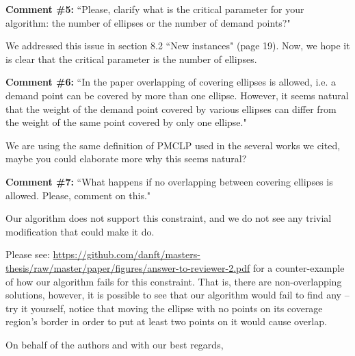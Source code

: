 \begin{letter}{}
		\textbf{Comment \#5:} ``Please, clarify what is the critical parameter for your algorithm: the number of ellipses or the number of demand points?"
		
		We addressed this issue in section 8.2 ``New instances" (page 19). Now, we hope it is clear that the critical parameter is the number of ellipses.
		
		\textbf{Comment \#6:} ``In the paper overlapping of covering ellipses is allowed, i.e. a demand point can be covered by more than one ellipse. However, it seems natural that the weight of the demand point covered by various ellipses can differ from the weight of the same point covered by only one ellipse."
		
		We are using the same definition of PMCLP used in the several works we cited, maybe you could elaborate more why this seems natural?
		
		\textbf{Comment \#7:} ``What happens if no overlapping between covering ellipses is allowed. Please, comment on this."
		
		Our algorithm does not support this constraint, and we do not see any trivial modification that could make it do.
		
		Please see: \href{https://github.com/danft/masters-thesis/raw/master/paper/figures/answer-to-reviewer-2.pdf}{https://github.com/danft/masters-thesis/raw/master/paper/figures/answer-to-reviewer-2.pdf} for a counter-example of how our algorithm fails for this constraint. That is, there are non-overlapping solutions, however, it is possible to see that our algorithm would fail to find any -- try it yourself, notice that moving the ellipse with no points on its coverage region's border in order to put at least two points on it would cause overlap. 
		
		\closing{On behalf of the authors and with our best regards,}
			\end{letter}